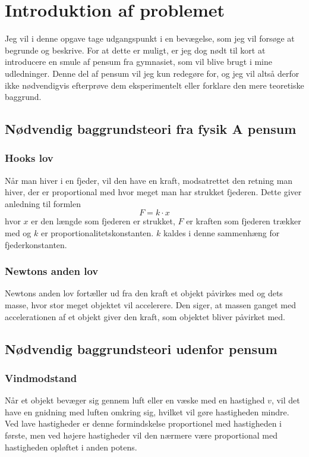 \chapter{Introduktion af problemet}
Jeg vil i denne opgave tage udgangspunkt i en bevægelse, som jeg vil forsøge at begrunde og beskrive. 
For at dette er muligt, er jeg dog nødt til kort at introducere en smule af pensum fra gymnasiet, som vil blive brugt i mine udledninger. 
Denne del af pensum vil jeg kun redegøre for, og jeg vil altså derfor ikke nødvendigvis efterprøve dem eksperimentelt eller forklare den mere teoretiske baggrund. 

\section{Nødvendig baggrundsteori fra fysik A pensum}
\subsection{Hooks lov}\label{teori:Hooks lov}
Når man hiver i en fjeder, vil den have en kraft, modsatrettet den retning man hiver, der er proportional med hvor meget man har strukket fjederen. 
Dette giver anledning til formlen 
$$F =k\cdot x$$
hvor $x$ er den længde som fjederen er strukket, $F$ er kraften som fjederen trækker med og $k$ er proportionalitetskonstanten. 
$k$ kaldes i denne sammenhæng for fjederkonstanten.

\subsection{Newtons anden lov}\label{teori:Newtons anden lov}
Newtons anden lov fortæller ud fra den kraft et objekt påvirkes med og dets masse, hvor stor meget objektet vil accelerere. 
Den siger, at massen ganget med accelerationen af et objekt giver den kraft, som objektet bliver påvirket med.

\section{Nødvendig baggrundsteori udenfor pensum}
\subsection{Vindmodstand}\label{teori:vindmodstand}
Når et objekt bevæger sig gennem luft eller en væske med en hastighed $v$, vil det have en gnidning med luften omkring sig, hvilket vil gøre hastigheden mindre. 
Ved lave hastigheder er denne formindskelse proportionel med hastigheden i første, men ved højere hastigheder vil den nærmere være proportional med hastigheden opløftet i anden potens. 
